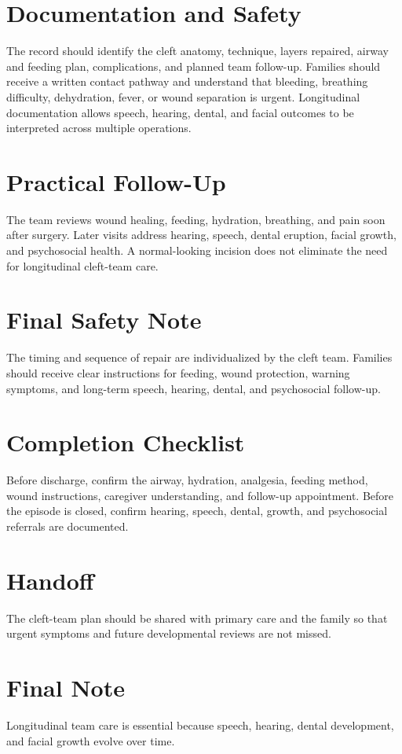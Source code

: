 \section*{Documentation and Safety}
The record should identify the cleft anatomy, technique, layers repaired, airway and feeding plan, complications, and planned team follow-up. Families should receive a written contact pathway and understand that bleeding, breathing difficulty, dehydration, fever, or wound separation is urgent. Longitudinal documentation allows speech, hearing, dental, and facial outcomes to be interpreted across multiple operations.

\section*{Practical Follow-Up}
The team reviews wound healing, feeding, hydration, breathing, and pain soon after surgery. Later visits address hearing, speech, dental eruption, facial growth, and psychosocial health. A normal-looking incision does not eliminate the need for longitudinal cleft-team care.

\section*{Final Safety Note}
The timing and sequence of repair are individualized by the cleft team. Families should receive clear instructions for feeding, wound protection, warning symptoms, and long-term speech, hearing, dental, and psychosocial follow-up.

\section*{Completion Checklist}
Before discharge, confirm the airway, hydration, analgesia, feeding method, wound instructions, caregiver understanding, and follow-up appointment. Before the episode is closed, confirm hearing, speech, dental, growth, and psychosocial referrals are documented.

\section*{Handoff}
The cleft-team plan should be shared with primary care and the family so that urgent symptoms and future developmental reviews are not missed.

\section*{Final Note}
Longitudinal team care is essential because speech, hearing, dental development, and facial growth evolve over time.

